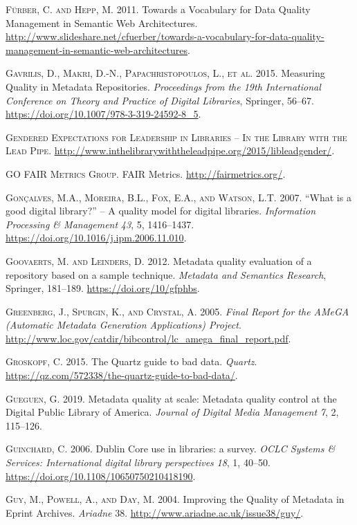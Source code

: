 \textsc{Fürber, C. and Hepp, M.} 2011. Towards a Vocabulary for Data Quality Management in Semantic Web Architectures. \url{http://www.slideshare.net/cfuerber/towards-a-vocabulary-for-data-quality-management-in-semantic-web-architectures}.

\textsc{Gavrilis, D., Makri, D.-N., Papachristopoulos, L., et al.} 2015. Measuring Quality in Metadata Repositories. \emph{Proceedings from the 19th International Conference on Theory and Practice of Digital Libraries}, Springer, 56–67. \url{https://doi.org/10.1007/978-3-319-24592-8_5}.

\textsc{Gendered Expectations for Leadership in Libraries – In the Library with the Lead Pipe}. \url{http://www.inthelibrarywiththeleadpipe.org/2015/libleadgender/}.

\textsc{GO FAIR Metrics Group}. FAIR Metrics. \url{http://fairmetrics.org/}.

\textsc{Gonçalves, M.A., Moreira, B.L., Fox, E.A., and Watson, L.T.} 2007. “What is a good digital library?” – A quality model for digital libraries. \emph{Information Processing \& Management} \emph{43}, 5, 1416–1437. \url{https://doi.org/10.1016/j.ipm.2006.11.010}.

\textsc{Goovaerts, M. and Leinders, D.} 2012. Metadata quality evaluation of a repository based on a sample technique. \emph{Metadata and Semantics Research}, Springer, 181–189. \url{https://doi.org/10/gfphbs}.

\textsc{Greenberg, J., Spurgin, K., and Crystal, A.} 2005. \emph{Final Report for the AMeGA (Automatic Metadata Generation Applications) Project}. \url{http://www.loc.gov/catdir/bibcontrol/lc_amega_final_report.pdf}.

\textsc{Groskopf, C.} 2015. The Quartz guide to bad data. \emph{Quartz}. \url{https://qz.com/572338/the-quartz-guide-to-bad-data/}.

\textsc{Gueguen, G.} 2019. Metadata quality at scale: Metadata quality control at the Digital Public Library of America. \emph{Journal of Digital Media Management} \emph{7}, 2, 115–126.

\textsc{Guinchard, C.} 2006. Dublin Core use in libraries: a survey. \emph{OCLC Systems \& Services: International digital library perspectives} \emph{18}, 1, 40–50. \url{https://doi.org/10.1108/10650750210418190}.

\textsc{Guy, M., Powell, A., and Day, M.} 2004. Improving the Quality of Metadata in Eprint Archives. \emph{Ariadne} 38. \url{http://www.ariadne.ac.uk/issue38/guy/}.

